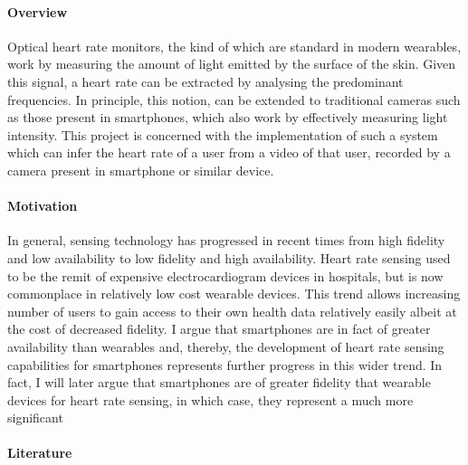 \paragraph{Overview}
Optical heart rate monitors, the kind of which are standard in modern wearables,
work by measuring the amount of light emitted by the surface of the skin.
Given this signal, a heart rate can be extracted by analysing the predominant frequencies. In principle, 
this notion, can be extended to traditional cameras such as those present in smartphones, which also work by effectively measuring light intensity.
This project is concerned with the implementation of such a system which can infer the heart rate of a user from a video of that user, recorded by a camera 
present in smartphone or similar device.

\paragraph{Motivation}
In general, sensing technology has progressed in recent times from high fidelity and low availability to low fidelity and high availability.
Heart rate sensing used to be the remit of expensive electrocardiogram devices in hospitals, but is now commonplace in relatively low cost wearable devices.
This trend allows increasing number of users to gain access to their own health data relatively easily albeit at the cost of decreased fidelity.
I argue that smartphones are in fact of greater availability than wearables and, thereby, the development of heart rate sensing capabilities for 
smartphones represents further progress in this wider trend. 
In fact, I will later argue that smartphones are of greater fidelity that wearable devices for heart rate sensing, in which case, they represent a much more significant 

\paragraph{Literature}
